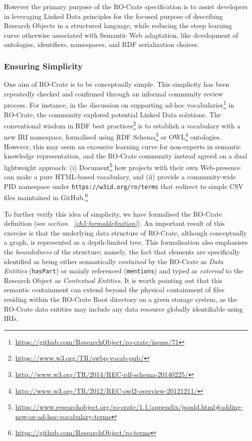 However the primary purpose of the RO-Crate specification is to assist
developers in leveraging Linked Data principles for the focused purpose
of describing Research Objects in a structured language, while reducing
the steep learning curve otherwise associated with Semantic Web
adaptation, like development of ontologies, identifiers, namespaces, and
RDF serialization choices.

\subsubsection{Ensuring Simplicity}\label{ch5:simplicity}

One aim of RO-Crate is to be conceptually simple. This simplicity has
been repeatedly checked and confirmed through an informal community
review process. For instance, in the discussion on supporting ad-hoc
vocabularies\footnote{\url{https://github.com/ResearchObject/ro-crate/issues/71}} in
RO-Crate, the community explored potential Linked Data solutions. The
conventional wisdom in RDF best
practices\footnote{\url{https://www.w3.org/TR/swbp-vocab-pub/}} is to establish a
vocabulary with a new IRI namespace, formalised using RDF
Schema\footnote{\url{http://www.w3.org/TR/2014/REC-rdf-schema-20140225/}} or
OWL\footnote{\url{http://www.w3.org/TR/2012/REC-owl2-overview-20121211/}}
ontologies. However, this may seem an excessive learning curve for
non-experts in semantic knowledge representation, and the RO-Crate
community instead agreed on a dual lightweight approach: (i)
Document\footnote{\url{https://www.researchobject.org/ro-crate/1.1/appendix/jsonld.html\#adding-new-or-ad-hoc-vocabulary-terms}}
how projects with their own Web-presence can make a pure HTML-based
vocabulary, and (ii) provide a community-wide PID namespace under
\texttt{https://w3id.org/ro/terms} that redirect to simple CSV files
maintained in GitHub.\footnote{\url{https://github.com/ResearchObject/ro-terms}}

To further verify this idea of simplicity, we have formalised the
RO-Crate definition (see \textit{section ~\vref{ch5:formaldefinition}}). An
important result of this exercise is that the underlying data structure
of RO-Crate, although conceptually a graph, is represented as a
depth-limited tree. This formalisation also emphasises the
\textit{boundedness} of the structure; namely, the fact that elements are
specifically identified as being either semantically \textit{contained} by the
RO-Crate as \textit{Data Entities} (\texttt{hasPart}) or mainly referenced
(\texttt{mentions}) and typed as \textit{external} to the Research Object as
\textit{Contextual Entities}. It is worth pointing out that this semantic
containment can extend beyond the physical containment of files
residing within the RO-Crate Root directory on a given storage system,
as the RO-Crate data entities may include any data resource globally
identifiable using IRIs.

